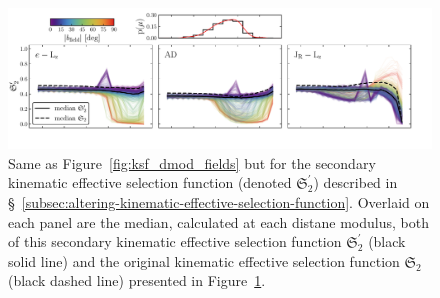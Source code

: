 \begin{figure}
    \centering
    \includegraphics[width=\halftextwidth]{figure/ch3/ksf2_dmod_fields.pdf}
    \caption{Same as Figure~\ref{fig:ksf_dmod_fields} but for the secondary kinematic effective selection function (denoted $\mathfrak{S}_{2}^{\prime}$) described in \S~\ref{subsec:altering-kinematic-effective-selection-function}. Overlaid on each panel are the median, calculated at each distane modulus, both of this secondary kinematic effective selection function $\mathfrak{S}_{2}^{\prime}$ (black solid line) and the original kinematic effective selection function $\mathfrak{S}_{2}$ (black dashed line) presented in Figure~\ref{fig:ksf2_dmod_fields}.}
    \label{fig:ksf2_dmod_fields}
\end{figure}


